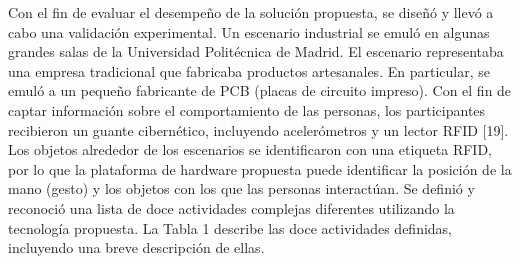 \documentclass[a4paper]{article}
\begin{document}
Con el fin de evaluar el desempeño de la solución propuesta, se diseñó y llevó a cabo una validación experimental. Un escenario industrial se emuló en algunas grandes salas de la Universidad Politécnica de Madrid. El escenario representaba una empresa tradicional que fabricaba productos artesanales. En particular, se emuló a un pequeño fabricante de PCB (placas de circuito impreso).
Con el fin de captar información sobre el comportamiento de las personas, los participantes recibieron un guante cibernético, incluyendo acelerómetros y un lector RFID [19]. Los objetos alrededor de los escenarios se identificaron con una etiqueta RFID, por lo que la plataforma de hardware propuesta puede identificar la posición de la mano (gesto) y los objetos con los que las personas interactúan.
Se definió y reconoció una lista de doce actividades complejas diferentes utilizando la tecnología propuesta. La Tabla 1 describe las doce actividades definidas, incluyendo una breve descripción de ellas.

\end{document}
